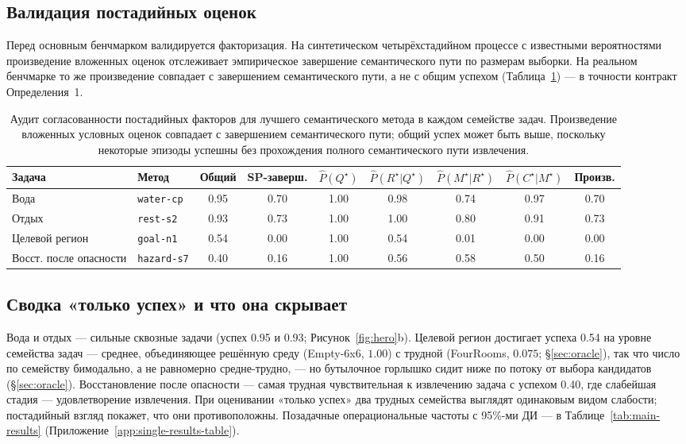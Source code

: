 \documentclass{article}
\begin{document}
\subsection{Валидация постадийных оценок}
\label{sec:validation}

Перед основным бенчмарком валидируется факторизация. На
синтетическом четырёхстадийном процессе с известными вероятностями
произведение вложенных оценок отслеживает эмпирическое завершение семантического пути
по размерам выборки. На реальном бенчмарке то же произведение совпадает с
завершением семантического пути, а не с общим успехом
(Таблица~\ref{tab:consistency}) --- в точности контракт
Определения~1.

\begin{table}[t]
  \caption{Аудит согласованности постадийных факторов для лучшего семантического метода в каждом семействе задач. Произведение вложенных условных оценок совпадает с завершением семантического пути; общий успех может быть выше, поскольку некоторые эпизоды успешны без прохождения полного семантического пути извлечения.}
  \label{tab:consistency}
  \centering
  \small
  \begin{tabular}{p{1.7cm}p{2.5cm}c c c c c c c}
    \toprule
    Задача & Метод & Общий & SP-заверш. & $\hat P(Q^\star)$ & $\hat P(R^\star|Q^\star)$ & $\hat P(M^\star|R^\star)$ & $\hat P(C^\star|M^\star)$ & Произв. \\
    \midrule
    Вода & \texttt{water-cp} & 0.95 & 0.70 & 1.00 & 0.98 & 0.74 & 0.97 & 0.70 \\
    Отдых & \texttt{rest-s2} & 0.93 & 0.73 & 1.00 & 1.00 & 0.80 & 0.91 & 0.73 \\
    Целевой регион & \texttt{goal-n1} & 0.54 & 0.00 & 1.00 & 0.54 & 0.01 & 0.00 & 0.00 \\
    Восст. после опасности & \texttt{hazard-s7} & 0.40 & 0.16 & 1.00 & 0.56 & 0.58 & 0.50 & 0.16 \\
    \bottomrule
  \end{tabular}
\end{table}

\subsection{Сводка «только успех» и что она скрывает}
\label{sec:single-results}

Вода и отдых --- сильные сквозные задачи (успех 0.95 и 0.93; Рисунок~\ref{fig:hero}b). Целевой регион достигает успеха 0.54 на уровне семейства задач --- среднее, объединяющее решённую среду (Empty-6x6, $1.00$) с трудной (FourRooms, $0.075$; \S\ref{sec:oracle}), так что число по семейству бимодально, а не равномерно средне-трудно, --- но бутылочное горлышко сидит ниже по потоку от выбора кандидатов (\S\ref{sec:oracle}). Восстановление после опасности --- самая трудная чувствительная к извлечению задача с успехом 0.40, где слабейшая стадия --- удовлетворение извлечения. При оценивании «только успех» два трудных семейства выглядят одинаковым видом слабости; постадийный взгляд покажет, что они противоположны. Позадачные операциональные частоты с 95\%-ми ДИ --- в Таблице~\ref{tab:main-results} (Приложение~\ref{app:single-results-table}).
\end{document}
